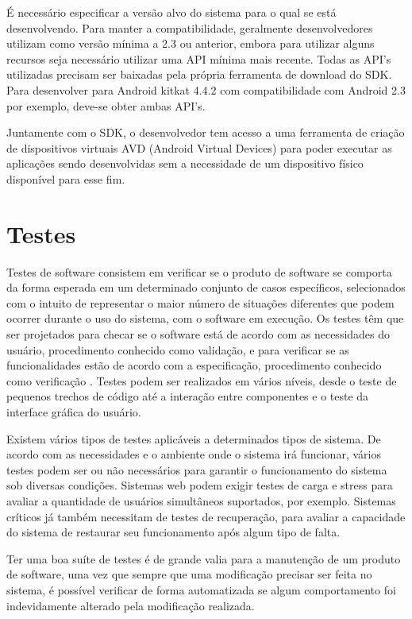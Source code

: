 É necessário especificar a versão alvo do sistema para o qual se está desenvolvendo. Para manter a compatibilidade, geralmente desenvolvedores utilizam como versão mínima a 2.3 ou anterior, embora para utilizar alguns recursos seja necessário utilizar uma API mínima mais recente. Todas as API's utilizadas precisam ser baixadas pela própria ferramenta de download do SDK. Para desenvolver para Android kitkat 4.4.2 com compatibilidade com Android 2.3 por exemplo, deve-se obter ambas API's.

Juntamente com o SDK, o desenvolvedor tem acesso a uma ferramenta de criação de dispositivos virtuais AVD (Android Virtual Devices) para poder executar as aplicações sendo desenvolvidas sem a necessidade de um dispositivo físico disponível para esse fim.

\section{Testes}

Testes de software consistem em verificar se o produto de software se comporta da forma esperada em um determinado conjunto de casos específicos, selecionados com o intuito de representar o maior número de situações diferentes que podem ocorrer durante o uso do sistema, com o software em execução. Os testes têm que ser projetados para checar se o software está de acordo com as necessidades do usuário, procedimento conhecido como validação, e para verificar se as funcionalidades estão de acordo com a especificação, procedimento conhecido como verificação \cite{swebok}. Testes podem ser realizados em vários níveis, desde o teste de pequenos trechos de código até a interação entre componentes e o teste da interface gráfica do usuário.

Existem vários tipos de testes aplicáveis a determinados tipos de sistema. De acordo com as necessidades e o ambiente onde o sistema irá funcionar, vários testes podem ser ou não necessários para garantir o funcionamento do sistema sob diversas condições. Sistemas web podem exigir testes de carga e stress para avaliar a quantidade de usuários simultâneos suportados, por exemplo. Sistemas críticos já também necessitam de testes de recuperação, para avaliar a capacidade do sistema de restaurar seu funcionamento após algum tipo de falta.

Ter uma boa suíte de testes é de grande valia para a manutenção de um produto de software, uma vez que sempre que uma modificação precisar ser feita no sistema, é possível verificar de forma automatizada se algum comportamento foi indevidamente alterado pela modificação realizada.

